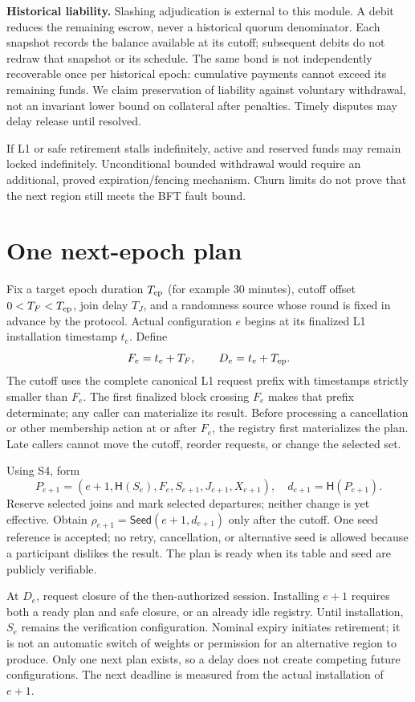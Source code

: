 \documentclass[11pt,a4paper]{article}
\newcommand{\Proc}[1]{\mathsf{#1}}
\newcommand{\Hash}{\mathsf H}
\begin{document}
\textbf{Historical liability.} Slashing adjudication is external to this
module. A debit reduces the remaining escrow, never a historical quorum
denominator. Each snapshot records the balance available at its cutoff;
subsequent debits do not redraw that snapshot or its schedule. The same
bond is not independently recoverable once per historical epoch: cumulative
payments cannot exceed its remaining funds. We claim preservation of
liability against voluntary withdrawal, not an invariant lower bound on
collateral after penalties. Timely disputes may delay release until resolved.

If L1 or safe retirement stalls indefinitely, active and reserved funds may
remain locked indefinitely. Unconditional bounded withdrawal would require
an additional, proved expiration/fencing mechanism. Churn limits do not
prove that the next region still meets the BFT fault bound.

\section{One next-epoch plan}
\label{sec:epoch}

Fix a target epoch duration $T_{\rm ep}$ (for example 30 minutes), cutoff
offset $0<T_F<T_{\rm ep}$, join delay $T_J$, and a randomness source whose
round is fixed in advance by the protocol. Actual configuration $e$ begins
at its finalized L1 installation timestamp $t_e$. Define
\[
 F_e=t_e+T_F,\qquad D_e=t_e+T_{\rm ep}.
\]
The cutoff uses the complete canonical L1 request prefix with timestamps
strictly smaller than $F_e$. The first finalized block crossing $F_e$
makes that prefix determinate; any caller can materialize its result.
Before processing a cancellation or other membership action at or after
$F_e$, the registry first materializes the plan. Late callers cannot move
the cutoff, reorder requests, or change the selected set.

Using S4, form
\[
P_{e+1}=(e+1,\Hash(S_e),F_e,S_{e+1},J_{e+1},X_{e+1}),\quad
d_{e+1}=\Hash(P_{e+1}).
\]
Reserve selected joins and mark selected departures; neither change is
yet effective. Obtain $\rho_{e+1}=\Proc{Seed}(e+1,d_{e+1})$ only after
the cutoff. One seed reference is accepted; no retry, cancellation, or
alternative seed is allowed because a participant dislikes the result.
The plan is ready when its table and seed are publicly verifiable.

At $D_e$, request closure of the then-authorized session. Installing $e+1$
requires both a ready plan and safe closure, or an already idle registry.
Until installation, $S_e$ remains the verification configuration.
Nominal expiry initiates retirement; it is not an automatic switch of
weights or permission for an alternative region to produce. Only one
next plan exists, so a delay does not create competing future configurations.
The next deadline is measured from the actual installation of $e+1$.
\end{document}
